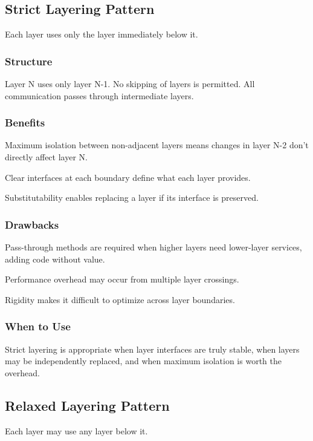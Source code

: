 \documentclass[11pt]{article}
\begin{document}
\subsection{Strict Layering Pattern}

Each layer uses only the layer immediately below it.

\subsubsection{Structure}

Layer N uses only layer N-1. No skipping of layers is permitted. All communication passes through intermediate layers.

\subsubsection{Benefits}

Maximum isolation between non-adjacent layers means changes in layer N-2 don't directly affect layer N.

Clear interfaces at each boundary define what each layer provides.

Substitutability enables replacing a layer if its interface is preserved.

\subsubsection{Drawbacks}

Pass-through methods are required when higher layers need lower-layer services, adding code without value.

Performance overhead may occur from multiple layer crossings.

Rigidity makes it difficult to optimize across layer boundaries.

\subsubsection{When to Use}

Strict layering is appropriate when layer interfaces are truly stable, when layers may be independently replaced, and when maximum isolation is worth the overhead.

\subsection{Relaxed Layering Pattern}

Each layer may use any layer below it.
\end{document}
